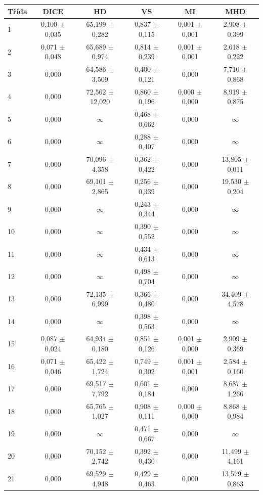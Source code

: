 \begin{tabular}{l c c c c c}
 \hline
Třída & DICE & HD & VS & MI & MHD \\ \hline
1 & 0,100 $\pm$ 0,035 & 65,199 $\pm$ 0,282 & 0,837 $\pm$ 0,115 & 0,001 $\pm$ 0,001 & 2,908 $\pm$ 0,399 \\
2 & 0,071 $\pm$ 0,048 & 65,689 $\pm$ 0,974 & 0,814 $\pm$ 0,239 & 0,001 $\pm$ 0,001 & 2,618 $\pm$ 0,222 \\
3 & 0,000 & 64,586 $\pm$ 3,509 & 0,400 $\pm$ 0,121 & 0,000 & 7,710 $\pm$ 0,868 \\
4 & 0,000 & 72,562 $\pm$ 12,020 & 0,860 $\pm$ 0,196 & 0,000 $\pm$ 0,000 & 8,919 $\pm$ 0,875 \\
5 & 0,000 & $\infty$ & 0,468 $\pm$ 0,662 & 0,000 & $\infty$ \\
6 & 0,000 & $\infty$ & 0,288 $\pm$ 0,407 & 0,000 & $\infty$ \\
7 & 0,000 & 70,096 $\pm$ 4,358 & 0,362 $\pm$ 0,422 & 0,000 & 13,805 $\pm$ 0,011 \\
8 & 0,000 & 69,101 $\pm$ 2,865 & 0,256 $\pm$ 0,339 & 0,000 & 19,530 $\pm$ 0,204 \\
9 & 0,000 & $\infty$ & 0,243 $\pm$ 0,344 & 0,000 & $\infty$ \\
10 & 0,000 & $\infty$ & 0,390 $\pm$ 0,552 & 0,000 & $\infty$ \\
11 & 0,000 & $\infty$ & 0,434 $\pm$ 0,613 & 0,000 & $\infty$ \\
12 & 0,000 & $\infty$ & 0,498 $\pm$ 0,704 & 0,000 & $\infty$ \\
13 & 0,000 & 72,135 $\pm$ 6,999 & 0,366 $\pm$ 0,480 & 0,000 & 34,409 $\pm$ 4,578 \\
14 & 0,000 & $\infty$ & 0,398 $\pm$ 0,563 & 0,000 & $\infty$ \\
15 & 0,087 $\pm$ 0,024 & 64,934 $\pm$ 0,180 & 0,851 $\pm$ 0,126 & 0,001 $\pm$ 0,000 & 2,909 $\pm$ 0,369 \\
16 & 0,071 $\pm$ 0,046 & 65,422 $\pm$ 1,724 & 0,749 $\pm$ 0,302 & 0,001 $\pm$ 0,001 & 2,584 $\pm$ 0,160 \\
17 & 0,000 & 69,517 $\pm$ 7,792 & 0,601 $\pm$ 0,184 & 0,000 & 8,687 $\pm$ 1,266 \\
18 & 0,000 & 65,765 $\pm$ 1,027 & 0,908 $\pm$ 0,111 & 0,000 $\pm$ 0,000 & 8,868 $\pm$ 0,984 \\
19 & 0,000 & $\infty$ & 0,471 $\pm$ 0,667 & 0,000 & $\infty$ \\
20 & 0,000 & 70,152 $\pm$ 2,742 & 0,392 $\pm$ 0,430 & 0,000 & 11,499 $\pm$ 4,161 \\
21 & 0,000 & 69,529 $\pm$ 4,948 & 0,429 $\pm$ 0,463 & 0,000 & 13,579 $\pm$ 0,863 \\

\end{tabular}
